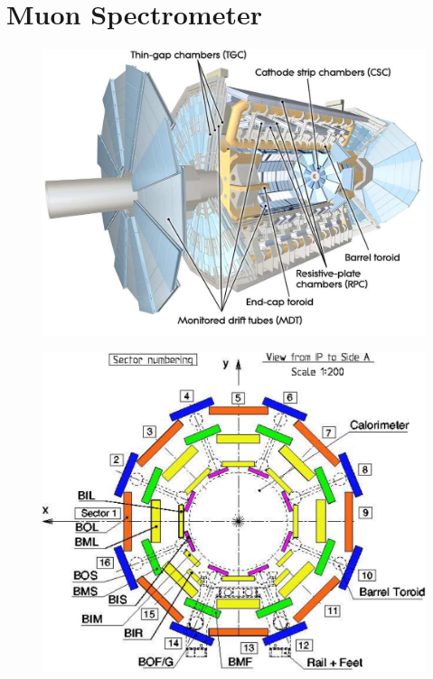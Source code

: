 
\section{Muon Spectrometer}

\begin{figure}[hbtp]
\includegraphics[width=\fullfig]{figures/muon_overview.pdf}
\caption{}
\label{fig:muon_overview}
\end{figure}


\begin{figure}[hbtp]
\includegraphics[width=\fullfig]{figures/muon_barrel_schematic.pdf}
\caption{}
\label{fig:muon_barrel_schematic}
\end{figure}

